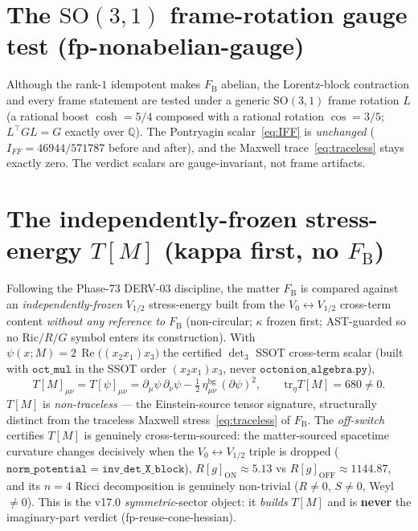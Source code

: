 \documentclass[11pt]{article}
\renewcommand{\Re}{\operatorname{Re}}
\newcommand{\SO}{\mathrm{SO}}
\newcommand{\FB}{F_{\mathrm{B}}}
\theoremstyle{plain}
\theoremstyle{definition}
\begin{document}
\section{The $\SO(3,1)$ frame-rotation gauge test (fp-nonabelian-gauge)}
\label{sec:frame}

Although the rank-$1$ idempotent makes $\FB$ abelian, the Lorentz-block contraction and
every frame statement are tested under a generic $\SO(3,1)$ frame rotation $L$ (a
rational boost $\cosh=5/4$ composed with a rational rotation $\cos=3/5$;
$L^\top G L = G$ exactly over $\mathbb{Q}$). The Pontryagin scalar~\eqref{eq:IFF} is
\emph{unchanged} ($I_{FF}=46944/571787$ before and after), and the Maxwell
trace~\eqref{eq:traceless} stays exactly zero. The verdict scalars are gauge-invariant,
not frame artifacts.

\section{The independently-frozen stress-energy $T[M]$ (kappa first, no $\FB$)}
\label{sec:TM}

Following the Phase-73 DERV-03 discipline, the matter $\FB$ is compared against an
\emph{independently-frozen} $V_{1/2}$ stress-energy built from the
$V_0\leftrightarrow V_{1/2}$ cross-term content \emph{without any reference to} $\FB$
(non-circular; $\kappa$ frozen first; AST-guarded so no $\mathrm{Ric}/R/G$ symbol enters
its construction). With $\psi(x;M)=2\,\Re\!\big((x_2 x_1)x_3\big)$ the certified
$\det_3$ SSOT cross-term scalar (built with $\mathtt{oct\_mul}$ in the SSOT order
$(x_2 x_1)x_3$, never $\mathtt{octonion\_algebra.py}$),
\begin{equation}
  T[M]_{\mu\nu}=T[\psi]_{\mu\nu}
    =\partial_\mu\psi\,\partial_\nu\psi
     -\tfrac12\,\eta^{\mathrm{bg}}_{\mu\nu}\,(\partial\psi)^2,
  \qquad
  \mathrm{tr}_\eta T[M]=680\neq0.
  \label{eq:TM}
\end{equation}
$T[M]$ is \emph{non-traceless} --- the Einstein-source tensor signature, structurally
distinct from the traceless Maxwell stress~\eqref{eq:traceless} of $\FB$. The
\emph{off-switch} certifies $T[M]$ is genuinely cross-term-sourced: the matter-sourced
spacetime curvature changes decisively when the $V_0\leftrightarrow V_{1/2}$ triple is
dropped ($\mathtt{norm\_potential}=\mathtt{inv\_det\_X\_block}$),
$R[g]_{\mathrm{ON}}\approx5.13$ vs $R[g]_{\mathrm{OFF}}\approx1144.87$, and its
$n=4$ Ricci decomposition is genuinely non-trivial ($R\neq0$, $S\neq0$, Weyl $\neq0$).
This is the v17.0 \emph{symmetric}-sector object: it \emph{builds} $T[M]$ and is
\textbf{never} the imaginary-part verdict (fp-reuse-cone-hessian).
\end{document}
